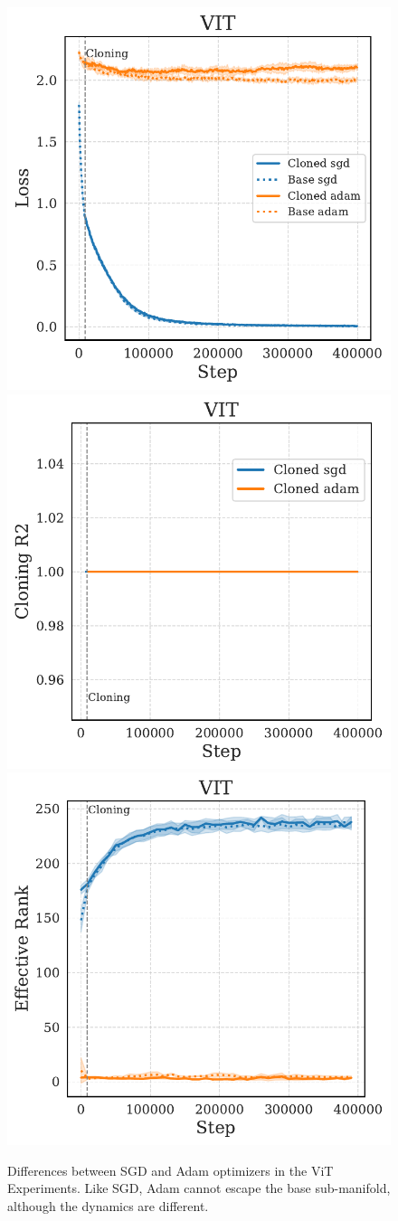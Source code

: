 \documentclass{article}
\numberwithin{figure}{section}
\begin{document}
\begin{figure}
    \centering
    \includegraphics[width=0.3\linewidth]{paper/images/vit_optimizer_cloning_losses_plot.pdf}
    \includegraphics[width=0.3\linewidth]{paper/images/vit_optimizer_cloning_r2_plot.pdf}
    \includegraphics[width=0.3\linewidth]{paper/images/vit_optimizer_cloning_rank_plot.pdf}
    \caption{Differences between SGD and Adam optimizers in the ViT Experiments. Like SGD, Adam cannot escape the base sub-manifold, although the dynamics are different.}
    \label{fig:enter-label}
\end{figure}
\end{document}
